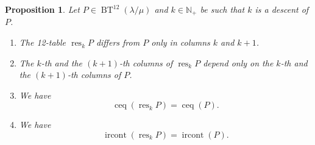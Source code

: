 \documentclass[12pt]{article}
\theoremstyle{plain}
\newtheorem{proposition}[theorem]{Proposition}
\theoremstyle{definition}
\def\BenignTables{{\operatorname{BT}^{12}\left(  \lambda/\mu\right)}}
\begin{document}
\begin{proposition}
\label{prop.descent-resolution-props}Let $P\in\BenignTables$ and $k\in
\mathbb{N}_{+}$ be such that $k$ is a descent of $P$.

\begin{enumerate}
\renewcommand{\theenumi}{\alph{enumi}}
\renewcommand{\labelenumi}{\textbf{(\theenumi)}}

\item \label{pf.lem.BK.res.loc}
The 12-table $\operatorname*{res}\nolimits_{k}P$ differs from $P$
only in columns $k$ and $k+1$.

\item \label{pf.lem.BK.res.loc2}
The $k$-th and the $\left(  k+1\right)  $-th columns of
$\operatorname*{res}\nolimits_{k}P$ depend only on the $k$-th and the $\left(
k+1\right)  $-th columns of $P$.

\item \label{pf.lem.BK.res.ceq}
We have%
\[
\operatorname*{ceq}\left(  \operatorname*{res}\nolimits_{k}P\right)
=\operatorname*{ceq}\left(  P\right) .
\]

\item \label{pf.lem.BK.res.irconts}
We have%
\[
\operatorname*{ircont}\left(  \operatorname*{res}\nolimits_{k}P\right)
=\operatorname*{ircont}\left(  P\right)  .
\]


\end{enumerate}
\end{proposition}
\end{document}
